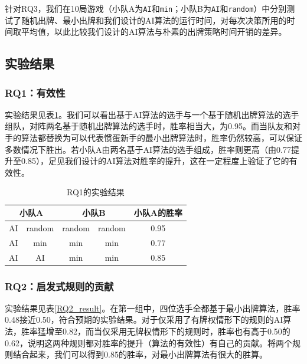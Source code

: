 \documentclass[a4paper]{ctexart}
\begin{document}
针对RQ3，我们在10局游戏（小队A为\texttt{AI}和\texttt{min}；小队B为\texttt{AI}和\texttt{random}）中分别测试了随机出牌、最小出牌和我们设计的AI算法的运行时间，对每次决策所用的时间取平均值，以此比较我们设计的AI算法与朴素的出牌策略时间开销的差异。

\subsection{实验结果}

\subsubsection{RQ1：有效性}

实验结果见表\ref{RQ1_result}。我们可以看出基于AI算法的选手与一个基于随机出牌算法的选手组队，对阵两名基于随机出牌算法的选手时，胜率相当大，为0.95。而当队友和对手的算法都替换为可以代表惯蛋新手的最小出牌算法时，胜率仍然较高，可以保证多数情况下胜出。若小队A由两名基于AI算法的选手组成，胜率则更高（由0.77提升至0.85），足见我们设计的AI算法对胜率的提升，这在一定程度上验证了它的有效性。

\begin{table}
	\centering 
	\caption{RQ1的实验结果}
	\label{RQ1_result}
	\begin{tabular}{|c|c|c|c|c|}
		\hline
		\multicolumn{2}{|c|}{小队A} & \multicolumn{2}{c|}{小队B} & 小队A的胜率\\ \hline
		AI        &    random       & random         & random &   0.95     \\ \hline
		AI       & min       & min         & min       &  0.77 \\ \hline
		AI & AI & min & min & 0.85 \\ \hline
	\end{tabular}
\end{table}

\subsubsection{RQ2：启发式规则的贡献}

实验结果见表\ref{RQ2_result}。在第一组中，四位选手全都基于最小出牌算法，胜率0.48接近0.50，符合预期的实验结果。对于仅采用了有牌权情形下的规则的AI算法，胜率猛增至0.82，而当仅采用无牌权情形下的规则时，胜率也有高于0.50的0.62，说明这两种规则都对胜率的提升（算法的有效性）有自己的贡献。将两个规则结合起来，我们可以得到0.85的胜率，对最小出牌算法有很大的胜算。
\end{document}
